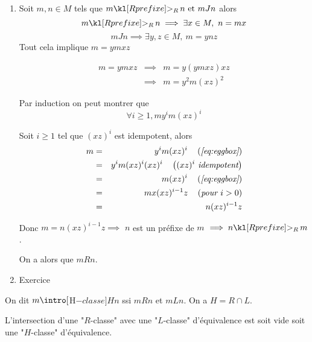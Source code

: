 \begin{proofI}
	\begin{enumerate}
		\item Soit $m,n \in M$ tels que $m \geqr n \et m J n$ alors
		      $$m \geqr n  \implies \exists x \in M, \ n = mx$$
		      $$m J n  \implies \exists y,z \in M, \ m = ynz$$
		      Tout cela implique $m = ymxz$

		      \begin{eqnarray*}
			      m = ymxz &\implies& m = y(ym xz)xz\\
			      &\implies& m = y^2m (xz)^2
		      \end{eqnarray*}


		      Par induction on peut montrer que
		      \begin{equation} \label{eq:eggbox}
			      \forall i \geq 1, m y^i m (xz)^i
		      \end{equation}

		      Soit $i \geq 1$ tel que $(xz)^i$ est idempotent, alors
		      \begin{eqnarray*}
			      m &=& y^i m (xz)^i \quad\left(\textit{\ref{eq:eggbox}}\right)\\
			      &=& y^i m (xz)^i (xz)^i \quad\left(\textit{$(xz)^i$ idempotent}\right)\\
			      &=&  m (xz)^i \quad\left(\textit{\ref{eq:eggbox}}\right)\\
			      &=&  m x (xz)^{i-1} z \quad\left(\textit{pour $i > 0$}\right) \\
			      &=&  n (xz)^{i-1} z
		      \end{eqnarray*}

		      Donc $m = n (xz)^{i-1} z \implies$ $n$ est un préfixe de $m$ $\implies n \geqr m$.

		      On a alors que $m R n$.
		\item Exercice
	\end{enumerate}
\end{proofI}


\begin{definition}
	On dit $m \intro[$H$-classe]{H} n$ ssi $m R n $ et $m L n$. On a $H = R \cap L$.
\end{definition}

\begin{exercice}
	L'intersection d'une "$R$-classe" avec une "$L$-classe" d'équivalence est soit vide soit une "$H$-classe" d'équivalence.
\end{exercice}

